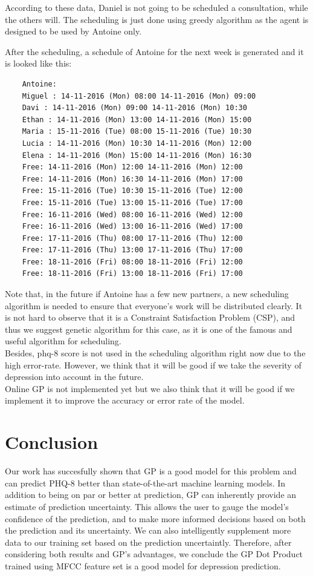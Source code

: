 \documentclass{article}
\begin{document}
	According to these data, Daniel is not going to be scheduled a consultation, while the others will.
	The scheduling is just done using greedy algorithm as the agent is designed to be used by Antoine only.

	After the scheduling, a schedule of Antoine for the next week is generated and it is looked like this:
	\begin{verbatim}
	Antoine:
	Miguel : 14-11-2016 (Mon) 08:00 14-11-2016 (Mon) 09:00
	Davi : 14-11-2016 (Mon) 09:00 14-11-2016 (Mon) 10:30
	Ethan : 14-11-2016 (Mon) 13:00 14-11-2016 (Mon) 15:00
	Maria : 15-11-2016 (Tue) 08:00 15-11-2016 (Tue) 10:30
	Lucia : 14-11-2016 (Mon) 10:30 14-11-2016 (Mon) 12:00
	Elena : 14-11-2016 (Mon) 15:00 14-11-2016 (Mon) 16:30
	Free: 14-11-2016 (Mon) 12:00 14-11-2016 (Mon) 12:00
	Free: 14-11-2016 (Mon) 16:30 14-11-2016 (Mon) 17:00
	Free: 15-11-2016 (Tue) 10:30 15-11-2016 (Tue) 12:00
	Free: 15-11-2016 (Tue) 13:00 15-11-2016 (Tue) 17:00
	Free: 16-11-2016 (Wed) 08:00 16-11-2016 (Wed) 12:00
	Free: 16-11-2016 (Wed) 13:00 16-11-2016 (Wed) 17:00
	Free: 17-11-2016 (Thu) 08:00 17-11-2016 (Thu) 12:00
	Free: 17-11-2016 (Thu) 13:00 17-11-2016 (Thu) 17:00
	Free: 18-11-2016 (Fri) 08:00 18-11-2016 (Fri) 12:00
	Free: 18-11-2016 (Fri) 13:00 18-11-2016 (Fri) 17:00
	\end{verbatim}
	
	Note that, in the future if Antoine has a few new partners, a new scheduling algorithm is needed to ensure that everyone's work will be distributed clearly.
	It is not hard to observe that it is a Constraint Satisfaction Problem (CSP), and thus we suggest genetic algorithm for this case, 
	as it is one of the famous and useful algorithm for scheduling. \\

	Besides, phq-8 score is not used in the scheduling algorithm right now due to the high error-rate. However, we think that it will be good if we take 
	the severity of depression into account in the future. \\

	Online GP is not implemented yet but we also think that it will be good if we implement it to improve the accuracy or error rate of the model.
	
	\section{Conclusion}	
	Our work has succesfully shown that GP is a good model for this problem and can predict PHQ-8 better than state-of-the-art machine learning models. 
	In addition to being on par or better at prediction, GP can inherently provide an estimate of prediction uncertainty. 
	This allows the user to gauge the model's confidence of the prediction, and to make more informed decisions based on both the prediction and its uncertainty. 
	We can also intelligently supplement more data to our training set based on the prediction uncertaintly. 
	Therefore, after considering both results and GP's advantages, we conclude the GP Dot Product trained using MFCC feature set is a good model for 
	depression prediction.
	
\end{document}
